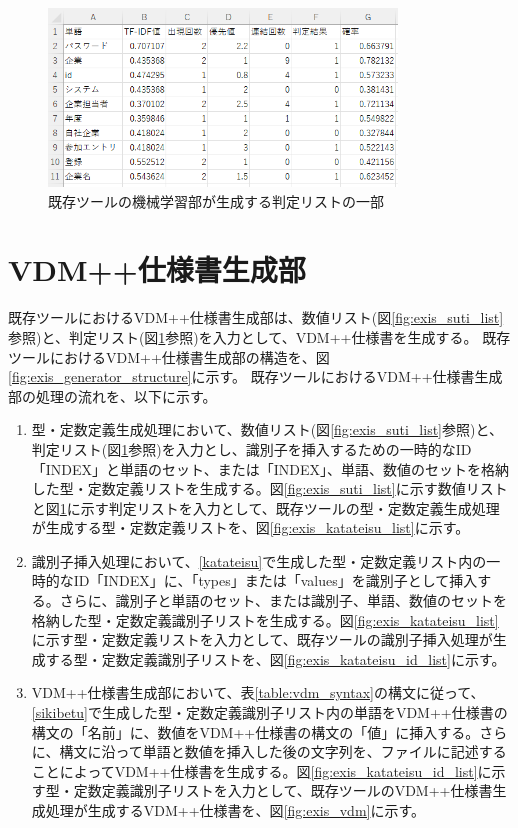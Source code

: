 \begin{figure}[tp]
    \begin{center}
        \includegraphics[width=350]{image/exis_judge_list.png}
        \caption{既存ツールの機械学習部が生成する判定リストの一部}
        \label{fig:exis_judge_list}
    \end{center}
\end{figure}

\section{VDM++仕様書生成部}
既存ツールにおけるVDM++仕様書生成部は、数値リスト(図\ref{fig:exis_suti_list}参照)と、判定リスト(図\ref{fig:exis_judge_list}参照)を入力として、VDM++仕様書を生成する。
既存ツールにおけるVDM++仕様書生成部の構造を、図\ref{fig:exis_generator_structure}に示す。
既存ツールにおけるVDM++仕様書生成部の処理の流れを、以下に示す。

\begin{enumerate}
    \item 型・定数定義生成処理において、数値リスト(図\ref{fig:exis_suti_list}参照)と、判定リスト(図\ref{fig:exis_judge_list}参照)を入力とし、識別子を挿入するための一時的なID「INDEX」と単語のセット、または「INDEX」、単語、数値のセットを格納した型・定数定義リストを生成する。図\ref{fig:exis_suti_list}に示す数値リストと図\ref{fig:exis_judge_list}に示す判定リストを入力として、既存ツールの型・定数定義生成処理が生成する型・定数定義リストを、図\ref{fig:exis_katateisu_list}に示す。
    \label{katateisu}
    \item 識別子挿入処理において、\ref{katateisu}で生成した型・定数定義リスト内の一時的なID「INDEX」に、「types」または「values」を識別子として挿入する。さらに、識別子と単語のセット、または識別子、単語、数値のセットを格納した型・定数定義識別子リストを生成する。図\ref{fig:exis_katateisu_list}に示す型・定数定義リストを入力として、既存ツールの識別子挿入処理が生成する型・定数定義識別子リストを、図\ref{fig:exis_katateisu_id_list}に示す。
    \label{sikibetu}
    \item VDM++仕様書生成部において、表\ref{table:vdm_syntax}の構文に従って、\ref{sikibetu}で生成した型・定数定義識別子リスト内の単語をVDM++仕様書の構文の「名前」に、数値をVDM++仕様書の構文の「値」に挿入する。さらに、構文に沿って単語と数値を挿入した後の文字列を、ファイルに記述することによってVDM++仕様書を生成する。図\ref{fig:exis_katateisu_id_list}に示す型・定数定義識別子リストを入力として、既存ツールのVDM++仕様書生成処理が生成するVDM++仕様書を、図\ref{fig:exis_vdm}に示す。
\end{enumerate}

